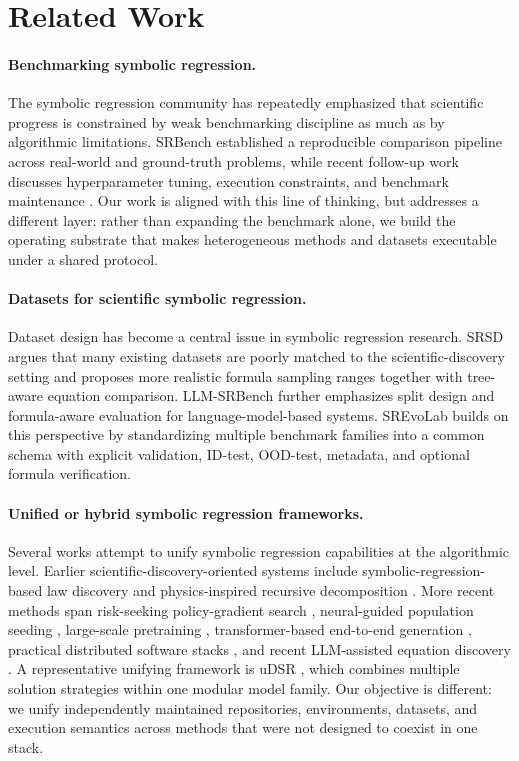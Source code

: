 \section{Related Work}

\paragraph{Benchmarking symbolic regression.}
The symbolic regression community has repeatedly emphasized that scientific progress is constrained by weak benchmarking discipline as much as by algorithmic limitations. SRBench \citep{lacava2021srbench} established a reproducible comparison pipeline across real-world and ground-truth problems, while recent follow-up work discusses hyperparameter tuning, execution constraints, and benchmark maintenance \citep{aldeia2025call}. Our work is aligned with this line of thinking, but addresses a different layer: rather than expanding the benchmark alone, we build the operating substrate that makes heterogeneous methods and datasets executable under a shared protocol.

\paragraph{Datasets for scientific symbolic regression.}
Dataset design has become a central issue in symbolic regression research. SRSD \citep{matsubara2022rethinking} argues that many existing datasets are poorly matched to the scientific-discovery setting and proposes more realistic formula sampling ranges together with tree-aware equation comparison. LLM-SRBench \citep{shojaee2025llmsrbench} further emphasizes split design and formula-aware evaluation for language-model-based systems. SREvoLab builds on this perspective by standardizing multiple benchmark families into a common schema with explicit validation, ID-test, OOD-test, metadata, and optional formula verification.

\paragraph{Unified or hybrid symbolic regression frameworks.}
Several works attempt to unify symbolic regression capabilities at the algorithmic level. Earlier scientific-discovery-oriented systems include symbolic-regression-based law discovery \citep{schmidt2009distilling} and physics-inspired recursive decomposition \citep{udrescu2020aifeynman,udrescu2020aifeynman2}. More recent methods span risk-seeking policy-gradient search \citep{petersen2021deep}, neural-guided population seeding \citep{mundhenk2021seeding}, large-scale pretraining \citep{biggio2021nsr}, transformer-based end-to-end generation \citep{valipour2021symbolicgpt,kamienny2022end,vastl2022symformer,tpsr2023}, practical distributed software stacks \citep{cranmer2023pysr}, and recent LLM-assisted equation discovery \citep{shojaee2024llm,wang2025drsr}. A representative unifying framework is uDSR \citep{landajuela2022udsr}, which combines multiple solution strategies within one modular model family. Our objective is different: we unify independently maintained repositories, environments, datasets, and execution semantics across methods that were not designed to coexist in one stack.

